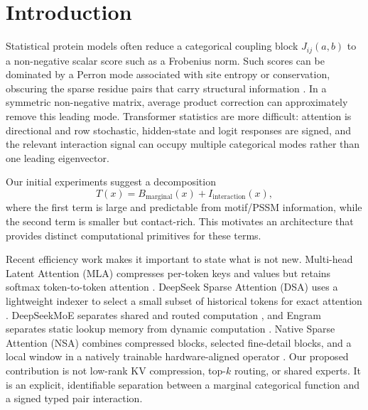 \documentclass[10pt]{article}
\begin{document}
\begin{abstract}
teacher fidelity in all three seeds but reduces the mean true-residue gain relative to simple
addition, indicating that aggregation capacity alone does not repair the supervision mismatch.
The teacher beats the local background on only 54.2\% of test targets; filtering distillation to
teacher-better training examples reduces teacher matching but still does not improve test CE.
A two-teacher consensus is a significantly better masked-residue predictor, yet rebuilding the
full conditional-response basis from consensus targets changes interaction CE by only
$0.000126$ with an interval crossing zero.  A leave-query-out MSA log-odds teacher, in contrast,
has a strong calibrated test CE gain, but the present site-shared value basis cannot learn its
categorical fields across families.
\end{abstract}

\section{Introduction}

Statistical protein models often reduce a categorical coupling block $J_{ij}(a,b)$ to a
non-negative scalar score such as a Frobenius norm.  Such scores can be dominated by a
Perron mode associated with site entropy or conservation, obscuring the sparse residue pairs
that carry structural information \cite{wang2024disentanglement}.  In a symmetric
non-negative matrix, average product correction can approximately remove this leading mode.
Transformer statistics are more difficult: attention is directional and row stochastic,
hidden-state and logit responses are signed, and the relevant interaction signal can occupy
multiple categorical modes rather than one leading eigenvector.

Our initial experiments suggest a decomposition
\begin{equation}
T(x) = B_{\mathrm{marginal}}(x) + I_{\mathrm{interaction}}(x),
\end{equation}
where the first term is large and predictable from motif/PSSM information, while the second
term is smaller but contact-rich.  This motivates an architecture that provides distinct
computational primitives for these terms.

Recent efficiency work makes it important to state what is not new.  Multi-head Latent
Attention (MLA) compresses per-token keys and values but retains softmax token-to-token
attention \cite{deepseekv2,deepseekv3}.  DeepSeek Sparse Attention (DSA) uses a lightweight
indexer to select a small subset of historical tokens for exact attention
\cite{deepseekv32}.  DeepSeekMoE separates shared and routed computation
\cite{deepseekmoe}, and Engram separates static lookup memory from dynamic computation
\cite{engram}.  Native Sparse Attention (NSA) combines compressed blocks, selected fine-detail
blocks, and a local window in a natively trainable hardware-aligned operator \cite{nsa}.
Our proposed contribution is not low-rank KV compression, top-$k$ routing,
or shared experts.  It is an explicit, identifiable separation between a marginal categorical
function and a signed typed pair interaction.
\end{document}
